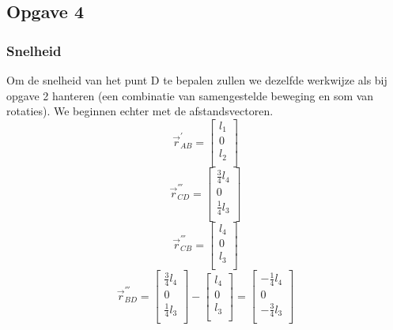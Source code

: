 \subsection{Opgave 4}
\subsubsection{Snelheid}
\label{sec:3.4.1}
Om de snelheid van het punt D te bepalen zullen we dezelfde werkwijze als bij opgave 2 hanteren (een combinatie van samengestelde beweging en som van rotaties). We beginnen echter met de afstandsvectoren.
\begin{equation}
\vec{r}_{AB}^{'}=
\begin{bmatrix}
l_{1}\\
0\\
l_{2}\\
\end{bmatrix}
\label{eq:kin4.1}
\end{equation}
\begin{equation}
\vec{r}_{CD}^{'''}=
\begin{bmatrix}
\frac{3}{4}l_{4}\\
0\\
\frac{1}{4}l_{3}\\
\end{bmatrix}
\label{eq:kin4.3}
\end{equation}
\begin{equation}
\vec{r}_{CB}^{'''}=
\begin{bmatrix}
l_{4}\\
0\\
l_{3}\\
\end{bmatrix}
\label{eq:kin4.4}
\end{equation}
\begin{equation}
\vec{r}_{BD}^{'''}=
\begin{bmatrix}
\frac{3}{4}l_{4}\\
0\\
\frac{1}{4}l_{3}\\
\end{bmatrix}
-\begin{bmatrix}
l_{4}\\
0\\
l_{3}\\
\end{bmatrix}
=\begin{bmatrix}
-\frac{1}{4}l_{4}\\
0\\
-\frac{3}{4}l_{3}\\
\end{bmatrix}
\label{eq:kin4.5}
\end{equation}
